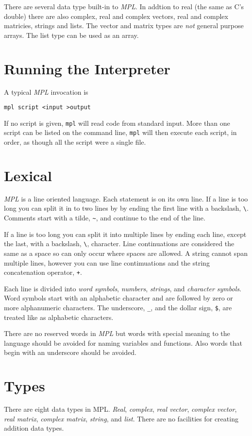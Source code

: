 \documentclass{article}
\begin{document}
There are several data type built-in to \emph{MPL}.
In addtion to real (the same as C's double) there are also
complex, real and complex vectors, real and complex matricies,
strings and lists.
The vector and matrix types are \emph{not} general purpose arrays.
The list type can be used as an array.

\section{Running the Interpreter}
A typical \emph{MPL} invocation is
\begin{verbatim}
mpl script <input >output
\end{verbatim}
If no script is given, \verb|mpl| will read code from standard input.
More than one script can be listed on the command line, \verb|mpl| will then
execute each script, in order, as though all the script were a single file.

\section{Lexical}
\emph{MPL} is a line oriented language.
Each statement is on its own line.
If a line is too long you can split it in to two lines by by ending
the first line with a backslash, \verb|\|.
Comments start with a tilde, \verb|~|, and continue to the end of the line.

If a line is too long you can split it into multiple lines by
ending each line, except the last, with a backslash, \verb|\|, character.
Line continuations are considered the same as a space so can only occur
where spaces are allowed.
A string cannot span multiple lines, however you can use line contimuations
and the string concatenation operator, \verb|+|.

Each line is divided into \emph{word symbols}, \emph{numbers},
\emph{strings}, and \emph{character symbols}.
Word symbols start with an alphabetic character and are followed by
zero or more alphanumeric characters.
The underscore, \verb|_|, and the dollar sign, \verb|$|, are treated like as
alphabetic characters.

There are no reserved words in \emph{MPL} but words with special meaning
to the language should be avoided for naming variables and functions.
Also words that begin with an underscore should be avoided.

\section{Types}
There are eight data types in MPL. \emph{Real}, \emph{complex},
\emph{real vector}, \emph{complex vector}, \emph{real matrix}, \emph{complex matrix}, \emph{string}, and \emph{list}. There are no facilities for creating
addition data types.
\end{document}
